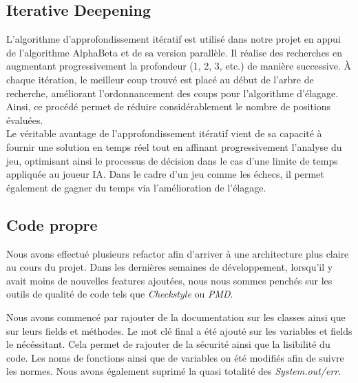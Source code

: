 \documentclass{article}
\begin{document}
\subsection{Iterative Deepening}

L'algorithme d'approfondissement itératif est utilisé dans notre projet en appui de l'algorithme AlphaBeta et de sa version parallèle. Il réalise des recherches en augmentant progressivement la profondeur (1, 2, 3, etc.) de manière successive. À chaque itération, le meilleur coup trouvé est placé au début de l'arbre de recherche, améliorant l'ordonnancement des coups pour l'algorithme d'élagage. Ainsi, ce procédé permet de réduire considérablement le nombre de positions évaluées.\\

Le véritable avantage de l'approfondissement itératif vient de sa capacité à fournir une solution en temps réel tout en affinant progressivement l'analyse du jeu, optimisant ainsi le processus de décision dans le cas d'une limite de temps appliquée au joueur IA.
Dans le cadre d'un jeu comme les échecs, il permet également de gagner du temps via l'amélioration de l'élagage.

\subsection{Code propre}
Nous avons effectué plusieurs refactor afin d'arriver à une architecture plus claire au cours du projet. Dans les dernières semaines de développement, 
lorsqu'il y avait moins de nouvelles features ajoutées, nous nous sommes penchés sur les outils de qualité de code tels que \textit{Checkstyle} ou \textit{PMD}.

Nous avons commencé par rajouter de la documentation sur les classes ainsi que sur leurs fields et méthodes. 
Le mot clé final a été ajouté sur les variables et fields le nécéssitant. Cela permet de rajouter de la sécurité ainsi que la lisibilité du code.
Les noms de fonctions ainsi que de variables on été modifiés afin de suivre les normes. Nous avons également suprimé la quasi totalité des \textit{System.out/err}.
\end{document}
